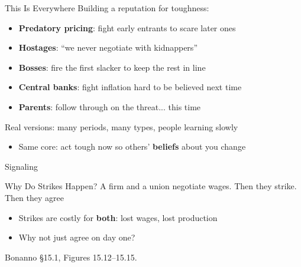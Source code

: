 \begin{frame}{This Is Everywhere}
Building a reputation for toughness:
\begin{itemize}
    \item \textbf{Predatory pricing}: fight early entrants to scare later ones
    \item \textbf{Hostages}: ``we never negotiate with kidnappers''
    \item \textbf{Bosses}: fire the first slacker to keep the rest in line
    \item \textbf{Central banks}: fight inflation hard to be believed next time
    \item \textbf{Parents}: follow through on the threat... this time
\end{itemize}
\bsk
Real versions: many periods, many types, people learning slowly
\begin{itemize}
    \item Same core: act tough now so others' \textbf{beliefs} about you change
\end{itemize}
\vspace{-0.3in}
\end{frame}


\begin{frame}[standout]
Signaling
\end{frame}

\begin{frame}{Why Do Strikes Happen?}
A firm and a union negotiate wages. Then they strike. Then they agree
\begin{itemize}
    \item Strikes are costly for \textbf{both}: lost wages, lost production
    \item Why not just agree on day one?
\end{itemize}
\bsk
{}
\vfill
{\footnotesize Bonanno \S15.1, Figures 15.12--15.15.}
\vspace{-0.2in}
\end{frame}

